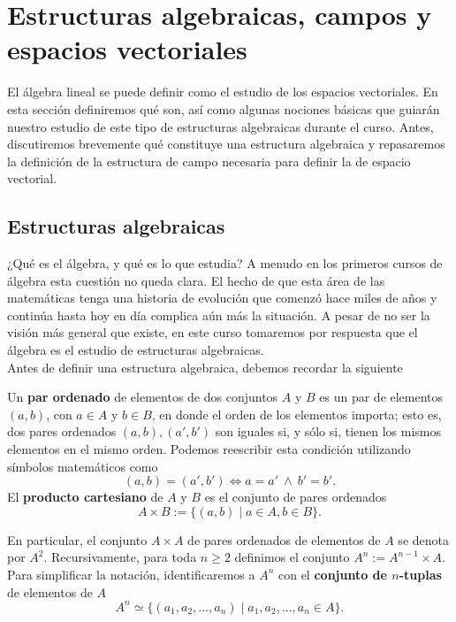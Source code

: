 \documentclass[notasLineal]{subfiles}
\begin{document}
\section{Estructuras algebraicas, campos y espacios vectoriales} \label{Sec: Estructuras algebraicas, campos y espacios vectoriales}

El álgebra lineal se puede definir como el estudio de los espacios vectoriales. En esta sección definiremos qué son, así como algunas nociones básicas que guiarán nuestro estudio de este tipo de estructuras algebraicas durante el curso. Antes, discutiremos brevemente qué constituye una estructura algebraica y repasaremos la definición de la estructura de campo \textemdash necesaria para definir la de espacio vectorial.

\subsection*{Estructuras algebraicas} \label{Ssec: Estructuras algebraicas}

¿Qué es el álgebra, y qué es lo que estudia? A menudo en los primeros cursos de álgebra esta cuestión no queda clara. El hecho de que esta área de las matemáticas tenga una historia de evolución que comenzó hace miles de años y continúa hasta hoy en día complica aún más la situación. A pesar de no ser la visión más general que existe, en este curso tomaremos por respuesta que el álgebra es el estudio de estructuras algebraicas. \\

Antes de definir una estructura algebraica, debemos recordar la siguiente

\begin{tcolorbox}
    \begin{Def}\label{Def: Par ordenado, producto cartesiano}
    Un \textbf{par ordenado} de elementos de dos conjuntos $A$ y $B$ es un par de elementos $(a,b)$, con $a\in A$ y $b\in B$, en donde el orden de los elementos importa; esto es, dos pares ordenados $(a,b), (a',b')$ son iguales si, y sólo si, tienen los mismos elementos en el mismo orden. Podemos reescribir esta condición utilizando símbolos matemáticos como
    \[
    (a,b)=(a',b')\iff a=a' \ \land \ b'=b'.
    \]
    El \textbf{producto cartesiano} de $A$ y $B$ es el conjunto de pares ordenados
    \[
    A\times B:= \{(a,b) \mid a\in A, b\in B\}.
    \] 

    En particular, el conjunto $A\times A$ de pares ordenados de elementos de $A$ se denota por $A^2$. Recursivamente, para toda $n\ge 2$ definimos el conjunto $A^n:= A^{n-1}\times A$. Para simplificar la notación, identificaremos a $A^n$ con el \textbf{conjunto de $n$-tuplas} de elementos de $A$
    \[
        A^n \simeq \{(a_1,a_2,...,a_n) \mid a_1,a_2,...,a_n\in A\}.
    \] 
    \end{Def}
\end{tcolorbox}
\end{document}
